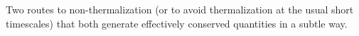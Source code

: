 \label{pt:summary}
Two routes to non-thermalization (or to avoid thermalization at the usual short timescales) that both generate effectively conserved quantities in a subtle way.